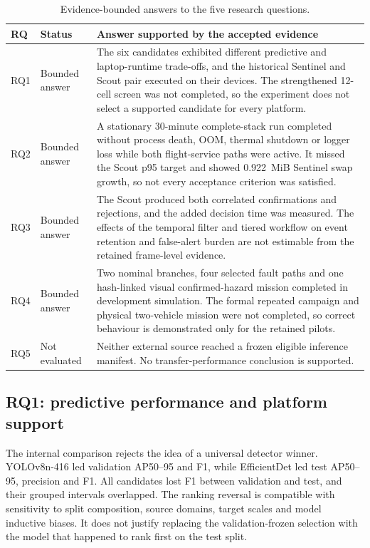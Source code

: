 \begin{table}[H]
  \centering
  \caption{Evidence-bounded answers to the five research questions.}
  \label{tab:discussion-rq-answers}
  \scriptsize
  \begin{tabularx}{\textwidth}{@{}p{}p{}X@{}}
    \toprule
    RQ & Status & Answer supported by the accepted evidence \\
    \midrule
    RQ1 & Bounded answer & The six candidates exhibited different
    predictive and laptop-runtime trade-offs, and the historical Sentinel and
    Scout pair executed on their devices. The strengthened 12-cell screen was
    not completed, so the experiment does not select a supported candidate for
    every platform. \\
    RQ2 & Bounded answer & A stationary 30-minute complete-stack run
    completed without process death, OOM, thermal shutdown or logger loss while
    both flight-service paths were active. It missed the Scout p95 target and
    showed 0.922~MiB Sentinel swap growth, so not every acceptance criterion was
    satisfied. \\
    RQ3 & Bounded answer & The Scout produced both correlated confirmations
    and rejections, and the added decision time was measured. The effects of
    the temporal filter and tiered workflow on event retention and false-alert burden
    are not estimable from the retained frame-level evidence. \\
    RQ4 & Bounded answer & Two nominal branches, four selected fault paths
    and one hash-linked visual confirmed-hazard mission completed in development
    simulation. The formal repeated campaign and physical two-vehicle mission
    were not completed, so correct behaviour is demonstrated only for the
    retained pilots. \\
    RQ5 & Not evaluated & Neither external source reached a frozen eligible
    inference manifest. No transfer-performance conclusion is supported. \\
    \bottomrule
  \end{tabularx}
\end{table}

\subsection*{RQ1: predictive performance and platform support}

The internal comparison rejects the idea of a universal detector winner.
YOLOv8n-416 led validation AP50--95 and F1, while EfficientDet led test
AP50--95, precision and F1. All candidates lost F1 between validation and test,
and their grouped intervals overlapped. The ranking reversal is compatible
with sensitivity to split composition, source domains, target scales and model
inductive biases. It does not justify replacing the validation-frozen selection
with the model that happened to rank first on the test split.

